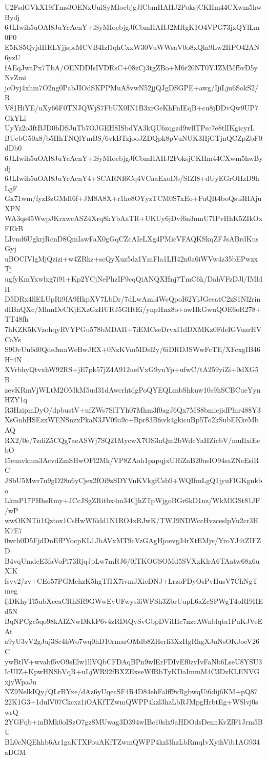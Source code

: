 U2FsdGVkX19fTms3OENxUuiSyMIoebjgJfCbmHAHJ2PoksjCKHm44CXwm5hwBydj
6JLIwih5uOAl8JuYcAcnY+iSyMIoebjgJfCbmHAHJ2MRgK1O4VPG73jxQYlLm0F0
E5KS5QvjdHRLYjjspsMCVB4Izl1qhCxxW30VuWWsaV0o8xQln9Lw2HPO42AN6yzU
fAEqJwaPx7TbA/OENDDIsIVDRsC+08zCj3tgZBo+M6r20NT0YJZMMf5vD5yNvZmi
jcOyj4xhm7O2ng0PabJIOdSKPPMuA8vwN52jjQJgDSGPE+awg/IjiLju6SokS2/R
V81HiYE/uXy66F0TNJQWjS7FbUX0IN1B3xrGeKhFnIEqB+cu8jDDvQw9UP7GkYLi
UyYz2o3ftBJD0bDSJuTb7OJGEH8ISbdYA3kQU6zqgzd9wllTPsc7e8tlIKgicyrL
BUcbG50x8/b5HhTNQlYmBS/6vkBTzjooJZDQpk8pVuNUK3HjGTjnQCZpZbF0dDb0
6JLIwih5uOAl8JuYcAcnY+iSyMIoebjgJfCbmHAHJ2PoksjCKHm44CXwm5hwBydj
6JLIwih5uOAl8JuYcAcnY4+SCARNI6Cq4VCaaExoDb/SIZl8+dUyEGrOHzD9hLgF
Gx71wm/fyzBzGMdI6f+JM8A8X+r1he8OYyzTCM0S7xEo+FuQIt4boQsu3HAjuXPN
WA3qs45WwpJKrxwcASZ4Xrq8kYbAaTR+UKUy6jDvf6n3mnU7IPvHhK5ZIkOxFEkB
LIvnd6UgkrjRcnD8QmIawFaX0gGqCZcAIeLXg4PMicVFAQKSkqZFJsABrdKusGyj
uBOCIVlgMjQzizi+w4ZRkz+scQyXuz5dz1YmFla1LH42n0a6iWVw4z35bEPwzxTj
ugfyKmYxwlxg7i91+Kp2YCjNePhzIF9cqQiANQXHnj7TmC6k/DahVFzDJl/IMldH
D5DRx4llELUpRi9fA9HkpXV7LbDr/7dLwAml4WcQpoI62YlJGeeatC2zS1Nl2rin
dIBnQXe/MhmDeCKjEXzGzHURJ5GHtEi/ynpHnx8o+awHkGwuQOE6oR278+TT48fh
7hKZK5KVzohqyRVYPGu578bMDAII+7iEMCseDrvxI1dDXMKz0FdeIGVuzrHVCaYs
S9OcUu6d0Qde3maWeBwJEX+0NzKVm5IDsl2y/6iDRDJSWwFcTE/XFcxgIB46Hr4N
XVrbhyQtvxhW92RS+jE7pk57jZ4A912uefVxG9ynYp+ufwC/tA259yiZi+0dXG5B
zevKRmVjWLtM2OMkM5ud31dAwcrhtdgPoQYEQLmbShkuw10s9hSCBCueYynHZY1q
R3HzipmDyO/dpbustV+ufZWs7SlTYh07Mhm3f0agJ6Qx7MS8bmicjidPlnr488Y3
XsGnhHSEzxWENSnzxPkaN3JV09a9c+Bpr83Bfsvk4gkicuBp5To2kSubEKkeMbAQ
RX2/0e/7zdiZ5CQg7aeASWj7SQ21MycwX7OS3nQm2bWdcYaHZicbV/muIlxiEebO
I5euavknm3AcvdZmSHwOFl2Mk/VP8ZAoh1papqjxUHiZaB20usIO94saZNeEsiRC
JSbU5Mwr7n9gD28n6yCjex2fOi9zSDYVnKVkgfCsb9+WQIfmLgQ1jyuFlGKgnkbo
LkmP17PHhsRmy+JCcJSgZRitbx4m34CjhZTpWjgoBGr6kD1nz/WkMlGSt81JF/wP
wwOKNTii1Qztox1CsHwW6kld1N1RO4xRJwK/TWJ9NDWccHvzceslpVu2cr3HK7E7
0wcb0D5FjdDnEfPYocpKL1JbAVxMT9cVzGAgHjoevg34rXtEMjv/YroYJ4tZIFZD
B4vqUmdeE3faVoPi73RjqJpLw7mRJ6/0fTKOGSOMd5SVXxKlrA6TAatw68x6uXlK
fsvv2/zv+CEo57PGMehzK5hgTf1X7ivmJXicDNJ+LrzoFDyOsPvHusV7ChNgTmeg
fjDKhyTl5ubXceaCRhSR9GWwEvUFwys3iWFSh3ZbrUupL6aZeSPWgT4oRI9HEd5N
BqNPCgc5qo98kAIZNwDKkP6v4zRDtQvSvGbpDViHIc7nzcAWnblqta1PuKJVcEAt
a9yU3vV2gJuj3Sc4hWo7wq0hD10rmarOMdb8ZHerfi3XzHgRhgXJuNsOKJoeV26C
ywBtlV+wvabf5vO9sElw1llVQbCFDAqBPn9wlErFDIvEf0zyIvFaNb6LseU8YSU3
IcUIZ+KpwHNSbVqR+uLjWR92fBXZExseWfRbTyKDaImmM4C3DzKLENVGxjyWpaJu
NZ9NelkIQy/QLrBYxe/dAz6yUqecSF4R4D84ehFalff9vRgbwqUi6dij6KM+pQ87
22K1G3+1dulV07Ckcxz1iOAKfTZwmQWPP4kzl3hzLbRJMpgHrbtEg+WSlvj0swrQ
2YGFqb+inBMk0oISzO7gz8MUwag3D394wIBc10slx9aHDOdsDennKvZfF1Jrm5BU
BL0cNQEhhb6Ar1gaKTXFouAKfTZwmQWPP4kzl3hzLbRmqIvXyihVib1AG934aDGM
